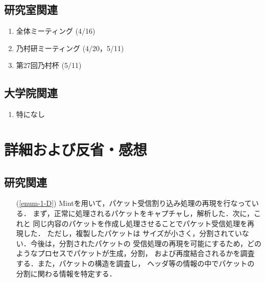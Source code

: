 \documentclass[fleqn, 14pt]{extarticle}
\begin{document}
\subsection{研究室関連}
\label{sec-2-2}
\begin{enumerate}

\item 全体ミーティング 
\hfill
\label{enum-lab1}
(4/16)

\item 乃村研ミーティング
\hfill
\label{enum-lab2}
(4/20，5/11)

\item 第27回乃村杯
\hfill
\label{enum-lab3}
(5/11)

\end{enumerate}

\subsection{大学院関連}
\label{sec2-3}
\begin{enumerate}

    \item 特になし
    \hfill
    \label{enum-univ2}

\end{enumerate}

\section{詳細および反省・感想}
\label{sec-3}
\subsection{研究関連}
\label{sec-3-1}
\begin{itemize}
\item[(\ref{enum-1-D})]
    Mintを用いて，パケット受信割り込み処理の再現を行なっている．
    まず，正常に処理されるパケットをキャプチャし，解析した．次に，これと
    同じ内容のパケットを作成し処理させることでパケット受信処理を再現した．
    ただし，複製したパケットは
    サイズが小さく，分割されていない．今後は，分割されたパケットの
    受信処理の再現を可能にするため，どのようなプロセスでパケットが生成，分割，
    および再度結合されるかを調査する．また，パケットの構造を調査し，
    ヘッダ等の情報の中でパケットの分割に関わる情報を特定する．
\end{itemize}
\end{document}
